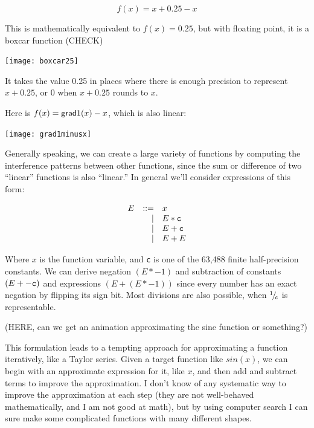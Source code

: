 \documentclass[twocolumn]{article}
\newcommand\sfrac[2]{\!{}\,^{#1}\!/{}\!_{#2}}
\begin{document}
$$f(x) = x + 0.25 - x$$

This is mathematically equivalent to $f(x) = 0.25$, but with floating point, it
is a boxcar function (CHECK)

\begin{center}
\texttt{[image: boxcar25]}
\end{center}

It takes the value 0.25 in places where there is enough precision to
represent $x + 0.25$, or 0 when $x + 0.25$ rounds to $x$.

Here is $f(x) = {\sf grad1}(x) - x$, which is also linear:
\begin{center}
\texttt{[image: grad1minusx]}
\end{center}

Generally speaking, we can create a large variety of functions by
computing the interference patterns between other functions, since the
sum or difference of two ``linear'' functions is also ``linear.'' In
general we'll consider expressions of this form:

\[
\begin{array}{rrl}
E & ::= & x              \\
  &  |  & E * {\tt c}    \\
  &  |  & E + {\tt c}    \\
  &  |  & E + E          \\
\end{array}
\]

Where $x$ is the function variable, and {\tt c} is one of the 63,488
finite half-precision constants. We can derive negation $(E * -1)$ and
subtraction of constants $(E + -{\tt c})$ and expressions $(E + (E *
-1))$ since every number has an exact negation by flipping its sign
bit. Most divisions are also possible, when $\sfrac{1}{{\tt c}}$ is
representable.

(HERE, can we get an animation approximating the sine function or something?)

This formulation leads to a tempting approach for approximating a function iteratively, like a Taylor series. Given a target function like $sin(x)$, we can begin with an approximate expression for it, like $x$, and then add and subtract terms to improve the approximation. I don't know of any systematic way to improve the approximation at each step (they are not well-behaved mathematically, and I am not good at math), but by using computer search I can sure make some complicated functions with many different shapes.
\end{document}
